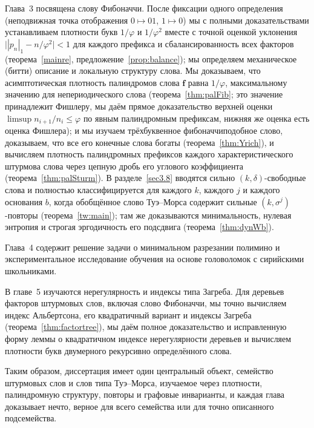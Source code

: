 \documentclass[a4paper,14pt]{extreport}
\theoremstyle{plain}
\theoremstyle{definition}
\theoremstyle{remark}
\begin{document}
	Глава~3 посвящена слову Фибоначчи. После фиксации одного определения (неподвижная точка отображения $0\mapsto01$, $1\mapsto0$) мы с полными доказательствами устанавливаем плотности букв $1/\varphi$ и $1/\varphi^{2}$ вместе с точной оценкой уклонения
	$\bigl||p_n|_1-n/\varphi^{2}\bigr|<1$ для каждого префикса и сбалансированность всех факторов (теорема~\ref{mainre}, предложение~\ref{prop:balance}); мы определяем механическое (битти) описание и локальную структуру слова. Мы доказываем, что асимптотическая плотность палиндромов слова $\mathbf f$ равна $1/\varphi$, максимальному значению для непериодического слова (теорема~\ref{thm:palFib}; это значение принадлежит Фишлеру, мы даём прямое доказательство верхней оценки $\limsup n_{i+1}/n_i\le\varphi$ по явным палиндромным префиксам, нижняя же оценка есть оценка Фишлера); и мы изучаем трёхбуквенное фибоначчиподобное слово, доказываем, что все его конечные слова богаты (теорема~\ref{thm:Yrich}), и вычисляем плотность палиндромных префиксов каждого характеристического штурмова слова через цепную дробь его углового коэффициента (теорема~\ref{thm:palSturm}). В разделе~\ref{sec3.8} вводятся сильно $(k,\delta)$-свободные слова и полностью классифицируется для каждого $k$, каждого $j$ и каждого основания $b$, когда обобщённое слово Туэ--Морса содержит сильные $(k,\sigma^j)$-повторы (теорема~\ref{tw:main}); там же доказываются минимальность, нулевая энтропия и строгая эргодичность его подсдвига (теорема~\ref{thm:dynWb}).
	
	Глава~4 содержит решение задачи о минимальном разрезании полимино и экспериментальное исследование обучения на основе головоломок с сирийскими школьниками.
	
	В главе~5 изучаются нерегулярность и индексы типа Загреба. Для деревьев факторов штурмовых слов, включая слово Фибоначчи, мы точно вычисляем индекс Альбертсона, его квадратичный вариант и индексы Загреба (теорема~\ref{thm:factortree}),
	мы даём полное доказательство и исправленную форму леммы о квадратичном индексе нерегулярности деревьев и вычисляем плотности букв двумерного рекурсивно определённого слова.
	
	Таким образом, диссертация имеет один центральный объект, семейство штурмовых слов и слов типа Туэ--Морса, изучаемое через плотности, палиндромную структуру, повторы и графовые инварианты, и каждая глава доказывает нечто, верное для всего семейства или для точно описанного подсемейства.	
\end{document}
